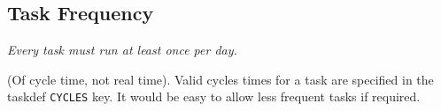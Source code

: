 \documentclass[11pt,a4paper]{article}
\begin{document}
\subsection{Task Frequency}

{\em Every task must run at least once per day.}

(Of cycle time, not real time). Valid cycles times for a task are 
specified in the taskdef \lstinline=CYCLES= key.  It would be
easy to allow less frequent tasks if required. 


%

%
\end{document}
